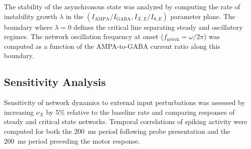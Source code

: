 \documentclass[10pt]{article}
\begin{document}
The stability of the asynchronous state was analyzed by computing the rate of instability growth $\lambda$ in the $(I_{\text{AMPA}}/I_{\text{GABA}}, I_{X,E}/I_{\theta,E})$ parameter plane. The boundary where $\lambda = 0$ defines the critical line separating steady and oscillatory regimes. The network oscillation frequency at onset ($f_{\text{ntwrk}} = \omega / 2\pi$) was computed as a function of the AMPA-to-GABA current ratio along this boundary.

\subsection{Sensitivity Analysis}

Sensitivity of network dynamics to external input perturbations was assessed by increasing $\nu_X$ by 5\% relative to the baseline rate and comparing responses of steady and critical state networks. Temporal correlations of spiking activity were computed for both the 200~ms period following probe presentation and the 200~ms period preceding the motor response.




\end{document}
